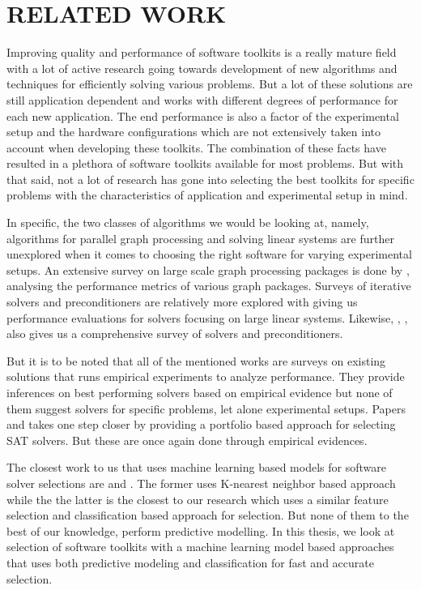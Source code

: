 \chapter{RELATED WORK}  

Improving quality and performance of software toolkits is a really mature field with a lot of active research going towards development of new algorithms and techniques for efficiently solving various problems. But a lot of these solutions are still application dependent and works with different degrees of performance for each new application. The end performance is also a factor of the experimental setup and the hardware configurations which are not extensively taken into account when developing these toolkits. The combination of these facts have resulted in a plethora of software toolkits available for most problems. But with that said, not a lot of research has gone into selecting the best toolkits for specific problems with the characteristics of application and experimental setup in mind.

In specific, the two classes of algorithms we would be looking at, namely, algorithms for parallel graph processing and solving linear systems are further unexplored when it comes to choosing the right software for varying experimental setups. An extensive survey on large scale graph processing packages is done by \cite{batarfi2015large}, analysing the performance metrics of various graph packages.  Surveys of iterative solvers and preconditioners are relatively more explored with \cite{benzi2002preconditioning} giving us performance evaluations for solvers focusing on large linear systems. Likewise, \cite{bruaset2018survey}, \cite{chow2006survey}, \cite{butrylo2004survey} also gives us a comprehensive survey of solvers and preconditioners.

But it is to be noted that all of the mentioned works are surveys on existing solutions that runs empirical experiments to analyze performance. They provide inferences on best performing solvers based on empirical evidence but none of them suggest solvers for specific problems, let alone experimental setups. Papers \cite{xu2008satzilla} and \cite{malitsky2012parallel} takes one step closer by providing a portfolio based approach for selecting SAT solvers. But these are once again done through empirical evidences. 

The closest work to us that uses machine learning based models for software solver selections are \cite{kadioglu2011algorithm} and \cite{bhowmick2009towards}. The former uses K-nearest neighbor based approach while the the latter is the closest to our research which uses a similar feature selection and classification based approach for selection. But none of them to the best of our knowledge, perform predictive modelling. In this thesis, we look at selection of software toolkits with a machine learning model based approaches that uses both predictive modeling and classification for fast and accurate selection.